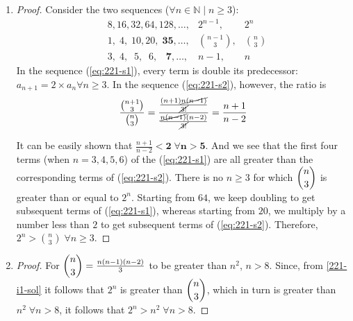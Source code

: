 \documentclass[11pt]{book}
\theoremstyle{definition}
\theoremstyle{plain}
\theoremstyle{definition}
\theoremstyle{problemstyle}
\theoremstyle{remark}
\theoremstyle{definition}
\begin{document}
    \begin{enumerate}[label=(\alph*)]
        \item \label{221-i1-sol}
            \begin{proof}
Consider the two sequences ($\forall n\in\mathbb{N}\mid n\geq3$):
\begin{align*}
    &8,16,32,64,128,\dots,&2^{n-1},&2^n\tag{s1}\label{eq:221-s1}\\
    &1,\;4,\;10,20,\;\boldsymbol{35},\dots,&\binom{n-1}{3},&\binom{n}{3}\tag{s2}\label{eq:221-s2}\\
    &3,\;4,\;\;5,\;\;6,\;\;\;\boldsymbol{7},\dots,&n-1,&n
\end{align*}
In the sequence (\ref{eq:221-s1}), every term is double its predecessor: $a_{n+1}=2\times a_n\forall n\geq3$. In the sequence (\ref{eq:221-s2}), however, the ratio is 
\[
    \frac{\binom{n+1}{3}}{\binom{n}{3}}=\frac{\frac{(n+1)\cancel{n(n-1)}}{\cancel{3!}}}{\frac{\cancel{n(n-1)}(n-2)}{\cancel{3!}}}=\frac{n+1}{n-2}
\]

            It can be easily shown that $\frac{n+1}{n-2}\boldsymbol{<2\;\forall n>5}$. And we see that the first four terms (when $n=3,4,5,6$) of the (\ref{eq:221-s1}) are all greater than the corresponding terms of (\ref{eq:221-s2}). There is no $n\geq3$ for which $\dbinom{n}{3}$ is greater than or equal to $2^n$. Starting from $64$, we keep doubling to get subsequent terms of (\ref{eq:221-s1}), whereas starting from $20$, we multiply by a number less than $2$ to get subsequent terms of (\ref{eq:221-s2}). Therefore, $2^n > \binom{n}{3}\;\forall n\geq3$.
    \end{proof}


\item 
    \begin{proof}
        For $\dbinom{n}{3}=\frac{n(n-1)(n-2)}{3}$ to be greater than $n^2$, $n>8$. Since, from \ref{221-i1-sol} it follows that $2^n$ is greater than $\dbinom{n}{3}$, which in turn is greater than $n^2\;\forall n>8$, it follows that $2^n>n^2\;\forall n>8$.
    \end{proof}
    \end{enumerate}
\end{document}
